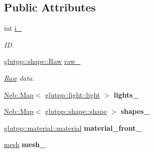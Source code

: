 \subsection*{\-Public \-Attributes}
\begin{DoxyCompactItemize}
\item 
\hypertarget{classglutpp_1_1shape_1_1shape_a963f3a4b84d97461e834290edf73e403}{int \hyperlink{classglutpp_1_1shape_1_1shape_a963f3a4b84d97461e834290edf73e403}{i\-\_\-}}\label{classglutpp_1_1shape_1_1shape_a963f3a4b84d97461e834290edf73e403}

\begin{DoxyCompactList}\small\item\em \-I\-D. \end{DoxyCompactList}\item 
\hypertarget{classglutpp_1_1shape_1_1shape_a1f1361357284b6902ef7ebcbc2aa4faa}{\hyperlink{classglutpp_1_1shape_1_1Raw}{glutpp\-::shape\-::\-Raw} \hyperlink{classglutpp_1_1shape_1_1shape_a1f1361357284b6902ef7ebcbc2aa4faa}{raw\-\_\-}}\label{classglutpp_1_1shape_1_1shape_a1f1361357284b6902ef7ebcbc2aa4faa}

\begin{DoxyCompactList}\small\item\em \hyperlink{classglutpp_1_1shape_1_1Raw}{\-Raw} data. \end{DoxyCompactList}\item 
\hypertarget{classglutpp_1_1shape_1_1shape_a6cb8f52fe3a017db70c1a3fd9bf24e43}{\hyperlink{classNeb_1_1Map}{\-Neb\-::\-Map}$<$ \hyperlink{classglutpp_1_1light_1_1light}{glutpp\-::light\-::light} $>$ {\bfseries lights\-\_\-}}\label{classglutpp_1_1shape_1_1shape_a6cb8f52fe3a017db70c1a3fd9bf24e43}

\item 
\hypertarget{classglutpp_1_1shape_1_1shape_a4239f6a99489e49e5bb8b8b4ec959f22}{\hyperlink{classNeb_1_1Map}{\-Neb\-::\-Map}$<$ \hyperlink{classglutpp_1_1shape_1_1shape}{glutpp\-::shape\-::shape} $>$ {\bfseries shapes\-\_\-}}\label{classglutpp_1_1shape_1_1shape_a4239f6a99489e49e5bb8b8b4ec959f22}

\item 
\hypertarget{classglutpp_1_1shape_1_1shape_a4a8c3bd997b65947911c268760ab9215}{\hyperlink{classglutpp_1_1material_1_1material}{glutpp\-::material\-::material} {\bfseries material\-\_\-front\-\_\-}}\label{classglutpp_1_1shape_1_1shape_a4a8c3bd997b65947911c268760ab9215}

\item 
\hypertarget{classglutpp_1_1shape_1_1shape_a41f1e4b0c44406b6d0e61c7d8ebd7442}{\hyperlink{classglutpp_1_1mesh}{mesh} {\bfseries mesh\-\_\-}}\label{classglutpp_1_1shape_1_1shape_a41f1e4b0c44406b6d0e61c7d8ebd7442}


\end{DoxyCompactItemize}
